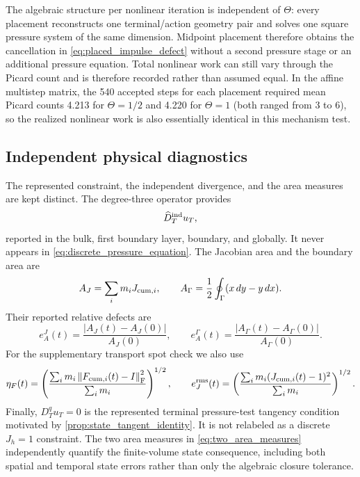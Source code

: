 \documentclass[11pt]{article}
\theoremstyle{plain}
\theoremstyle{definition}
\theoremstyle{remark}
\newcommand{\Th}{\Theta}
\newcommand{\norm}[2][]{\left\lVert #2\right\rVert_{#1}}
\begin{document}
The algebraic structure per nonlinear iteration is independent of $\Th$:
every placement reconstructs one terminal/action geometry pair and solves one
square pressure system of the same dimension.  Midpoint placement therefore
obtains the cancellation in \eqref{eq:placed_impulse_defect} without a second
pressure stage or an additional pressure equation.  Total nonlinear work can
still vary through the Picard count and is therefore recorded rather than
assumed equal.  In the affine multistep matrix, the 540 accepted steps for each
placement required mean Picard counts 4.213 for $\Th=1/2$ and 4.220 for
$\Th=1$ (both ranged from 3 to 6), so the realized nonlinear work is also
essentially identical in this mechanism test.

\subsection{Independent physical diagnostics}

The represented constraint, the independent divergence, and the area measures
are kept distinct.  The degree-three operator provides
\begin{equation}
 \widehat D_T^{\rm ind}u_T,
 \label{eq:independent_divergence}
\end{equation}
reported in the bulk, first boundary layer, boundary, and globally.  It never
appears in \eqref{eq:discrete_pressure_equation}.  The Jacobian area and the
boundary area are
\begin{equation}
 A_J=\sum_i m_iJ_{{\rm cum},i},
 \qquad
 A_\Gamma=\frac12\oint_\Gamma(x\,dy-y\,dx).
 \label{eq:two_area_measures}
\end{equation}
Their reported relative defects are
\begin{equation}
 e_A^J(t)=\frac{|A_J(t)-A_J(0)|}{A_J(0)},
 \qquad
 e_A^\Gamma(t)=\frac{|A_\Gamma(t)-A_\Gamma(0)|}{A_\Gamma(0)}.
 \label{eq:relative_area_defects}
\end{equation}
For the supplementary transport spot check we also use
\begin{equation}
 \eta_F(t)=
 \left(\frac{\sum_i m_i\norm[\mathrm F]{F_{{\rm cum},i}(t)-I}^2}
 {\sum_i m_i}\right)^{1/2},
 \qquad
 e_J^{\rm rms}(t)=
 \left(\frac{\sum_i m_i(J_{{\rm cum},i}(t)-1)^2}
 {\sum_i m_i}\right)^{1/2}.
 \label{eq:cumulative_deformation_diagnostics}
\end{equation}
Finally, $D_T^qu_T=0$ is the represented terminal pressure-test tangency
condition motivated by \cref{prop:state_tangent_identity}.  It is not relabeled
as a discrete $J_h=1$ constraint.  The two area measures in
\eqref{eq:two_area_measures} independently quantify the finite-volume state
consequence, including both spatial and temporal state errors rather than
only the algebraic closure tolerance.
\end{document}
